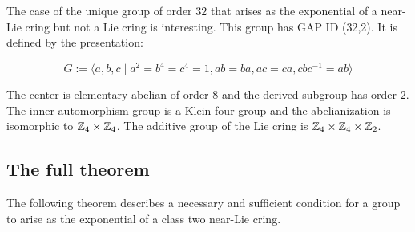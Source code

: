 \documentclass[10pt]{amsart}
\begin{document}
The case of the unique group of order $32$ that arises as the
exponential of a near-Lie cring but not a Lie cring is
interesting. This group has GAP ID (32,2). It is defined by the
presentation:

$$G := \langle a,b,c \mid a^2 = b^4 = c^4 = 1, ab = ba, ac = ca, cbc^{-1} = ab \rangle$$

The center is elementary abelian of order $8$ and the derived subgroup
has order $2$. The inner automorphism group is a Klein four-group and
the abelianization is isomorphic to $\mathbb{Z}_4 \times \mathbb{Z}_4$. The additive
group of the Lie cring is $\mathbb{Z}_4 \times \mathbb{Z}_4 \times \mathbb{Z}_2$. %

\subsection{The full theorem}

The following theorem describes a necessary and sufficient condition
for a group to arise as the exponential of a class two near-Lie cring.
\end{document}
